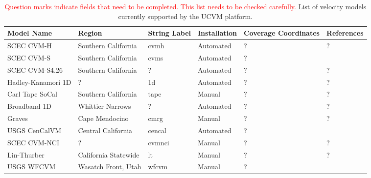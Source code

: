 
\begin{table*}
\centering
\small
\caption{\textcolor{red}{Question marks indicate fields that need to be completed. This list needs to be checked carefully.} List of velocity models currently supported by the UCVM platform.}
\begin{tabular}[]{lllllp{1.25in}}
\\
Model Name         & Region                & String Label & Installation & Coverage Coordinates & References \\
\hline
SCEC CVM-H         & Southern California   &   cvmh        &  Automated   & ?         & \citet{Plesch_2011_SCEC}     \newline
                                                                                        \citet{CVM-H_Manual}         \newline
                                                                                        ?                            \\
SCEC CVM-S         & Southern California   &   cvms        &  Automated   & ?         & \citet{Magistrale_1996_BSSA} \newline
                                                                                        \citet{Magistrale_2000_BSSA} \newline
                                                                                        \citet{Kohler_2003_BSSA}     \\
SCEC CVM-S4.26     & Southern California   &   ?           &  Automated   & ?         & ?                            \\
Hadley-Kanamori 1D & ?                     &   1d          &  Automated   & ?         & ?                            \\
Carl Tape SoCal    & Southern California   &   tape        &  Manual      & ?         & ?                            \\
Broadband 1D       & Whittier Narrows      &   ?           &  Automated   & ?         & ?                            \\
Graves             & Cape Mendocino        &   cmrg        &  Manual      & ?         & ?                            \\
USGS CenCalVM      & Central California    &   cencal      &  Automated   & ?         & \citet{Brocher_2005_Tech}    \newline
                                                                                        \citet{Brocher_2006_Proc}    \\
SCEC CVM-NCI       & ?                     &   cvmnci      &  Manual      & ?         & ?                            \\
Lin-Thurber        & California Statewide  &   lt          &  Manual      & ?         & ?                            \\
USGS WFCVM         & Wasatch Front, Utah   &   wfcvm       &  Manual      & ?         & \citet{Magistrale_2006_Tech} \\
\hline
\end{tabular}
\label{tab:cvms}
\end{table*}


